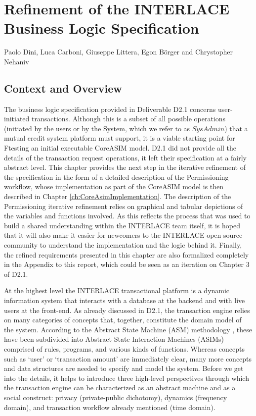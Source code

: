 \chapter{Refinement of the INTERLACE Business Logic Specification}
\label{ch:UpdatedBLS}

\vspace{-1cm}
\begin{center}
Paolo Dini, Luca Carboni, Giuseppe Littera, Egon B\"orger and Chrystopher Nehaniv
\end{center}

\section{Context and Overview}
The business logic specification provided in Deliverable D2.1 \cite{INTERLACE_D21} concerns user-initiated transactions. Although this is a subset of all possible operations (initiated by the users or by the System, which we refer to as $SysAdmin$) that a mutual credit system platform must support, it is a viable starting point for Ftesting an initial executable CoreASIM model. D2.1 did not provide all the details of the transaction request operations, it left their specification at a fairly abstract level. This chapter provides the next step in the iterative refinement of the specification in the form of a detailed description of the Permissioning workflow, whose implementation as part of the CoreASIM model is then described in Chapter \ref{ch:CoreAsimImplementation}. The description of the Permissioning iterative refinement relies on graphical and tabular depictions of the variables and functions involved. As this reflects the process that was used to build a shared understanding within the INTERLACE team itself, it is hoped that it will also make it easier for newcomers to the INTERLACE open source community to understand the implementation and the logic behind it. Finally, the refined requirements presented in this chapter are also formalized completely in the Appendix to this report, which could be seen as an iteration on Chapter 3 of D2.1.

At the highest level the INTERLACE transactional platform is a dynamic information system that interacts with a database at the backend and with live users at the front-end. As already discussed in D2.1, the transaction engine relies on many categories of concepts that, together, constitute the domain model of the system. According to the Abstract State Machine (ASM) methodology \cite{BoergerStaerk2003,BoergerRaschke2018}, these have been subdivided into Abstract State Interaction Machines (ASIMs) 
\cite{BIOMICSD42,BIOMICSD52} comprised of rules, programs, and various kinds of functions. Whereas concepts such as `user' or `transaction amount' are immediately clear, many more concepts and data structures are needed to specify and model the system. Before we get into the details, it helps to introduce three high-level perspectives through which the transaction engine can be characterized as an abstract machine and as a social construct: privacy (private-public dichotomy), dynamics (frequency domain), and transaction workflow already mentioned (time domain).

